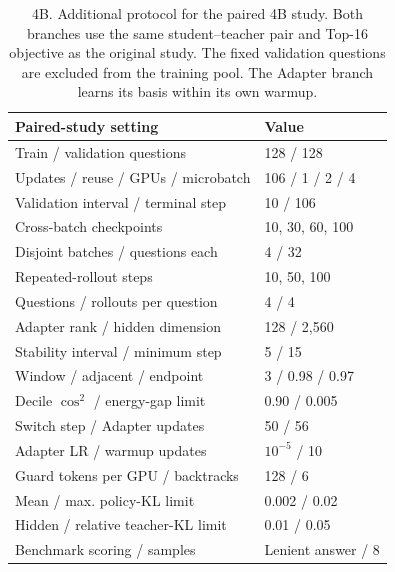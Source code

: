 \begin{table}[!htbp]
\centering
\caption{4B. Additional protocol for the paired 4B study. Both branches use the same student--teacher pair and Top-16 objective as the original study. The fixed validation questions are excluded from the training pool. The Adapter branch learns its basis within its own warmup.}
\label{tab:paired4b_settings}
\small
\setlength{\tabcolsep}{3pt}
\begin{tabular}{ll}
\toprule
Paired-study setting & Value \\
\midrule
Train / validation questions & 128 / 128 \\
Updates / reuse / GPUs / microbatch & 106 / 1 / 2 / 4 \\
Validation interval / terminal step & 10 / 106 \\
Cross-batch checkpoints & 10, 30, 60, 100 \\
Disjoint batches / questions each & 4 / 32 \\
Repeated-rollout steps & 10, 50, 100 \\
Questions / rollouts per question & 4 / 4 \\
Adapter rank / hidden dimension & 128 / 2,560 \\
Stability interval / minimum step & 5 / 15 \\
Window / adjacent / endpoint & 3 / 0.98 / 0.97 \\
Decile $\cos^2$ / energy-gap limit & 0.90 / 0.005 \\
Switch step / Adapter updates & 50 / 56 \\
Adapter LR / warmup updates & $10^{-5}$ / 10 \\
Guard tokens per GPU / backtracks & 128 / 6 \\
Mean / max. policy-KL limit & 0.002 / 0.02 \\
Hidden / relative teacher-KL limit & 0.01 / 0.05 \\
Benchmark scoring / samples & Lenient answer / 8 \\
\bottomrule
\end{tabular}
\end{table}
